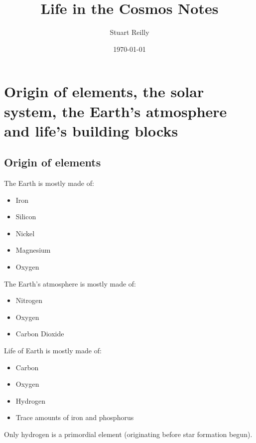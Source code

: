 \documentclass[12pt]{article}
\author{Stuart Reilly}
\date{\today}
\title{Life in the Cosmos Notes}
\begin{document}
\maketitle

\section{Origin of elements, the solar system, the Earth's atmosphere and life's building blocks}
	\subsection{Origin of elements}
	The Earth is mostly made of:
	\begin{itemize}
		\item Iron
		\item Silicon
		\item Nickel
		\item Magnesium
		\item Oxygen
	\end{itemize}
	The Earth's atmosphere is mostly made of:
	\begin{itemize}
		\item Nitrogen
		\item Oxygen
		\item Carbon Dioxide
	\end{itemize}
	Life of Earth is mostly made of:
	\begin{itemize}
		\item Carbon
		\item Oxygen
		\item Hydrogen
		\item Trace amounts of iron and phosphorus
	\end{itemize}
	Only hydrogen is  a primordial element (originating before star formation begun).
	
\end{document}
